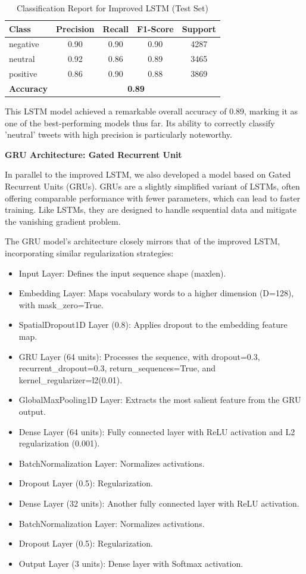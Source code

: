 \begin{table}[H]
\centering
\caption{Classification Report for Improved LSTM (Test Set)}
\begin{tabular}{|l|c|c|c|c|}
\hline
\textbf{Class} & \textbf{Precision} & \textbf{Recall} & \textbf{F1-Score} & \textbf{Support} \\
\hline
negative & 0.90 & 0.90 & 0.90 & 4287 \\
neutral  & 0.92 & 0.86 & 0.89 & 3465 \\
positive & 0.86 & 0.90 & 0.88 & 3869 \\
\hline
\textbf{Accuracy} & \multicolumn{4}{|c|}{\textbf{0.89}} \\
\hline
\end{tabular}
\label{tab:lstm2_classification_report}
\end{table}

This LSTM model achieved a remarkable overall accuracy of 0.89, marking it as one of the best-performing models thus far. Its ability to correctly classify 'neutral' tweets with high precision is particularly noteworthy.

\textbf{GRU Architecture: Gated Recurrent Unit
}

In parallel to the improved LSTM, we also developed a model based on Gated Recurrent Units (GRUs). GRUs are a slightly simplified variant of LSTMs, often offering comparable performance with fewer parameters, which can lead to faster training. Like LSTMs, they are designed to handle sequential data and mitigate the vanishing gradient problem.

The GRU model's architecture closely mirrors that of the improved LSTM, incorporating similar regularization strategies:

\begin{itemize}
    \item Input Layer: Defines the input sequence shape (maxlen).
    \item Embedding Layer: Maps vocabulary words to a higher dimension (D=128), with mask\_zero=True.
    \item SpatialDropout1D Layer (0.8): Applies dropout to the embedding feature map.
    \item GRU Layer (64 units): Processes the sequence, with dropout=0.3, recurrent\_dropout=0.3, return\_sequences=True, and kernel\_regularizer=l2(0.01).
    \item GlobalMaxPooling1D Layer: Extracts the most salient feature from the GRU output.
    \item Dense Layer (64 units): Fully connected layer with ReLU activation and L2 regularization (0.001).
    \item BatchNormalization Layer: Normalizes activations.
    \item Dropout Layer (0.5): Regularization.
    \item Dense Layer (32 units): Another fully connected layer with ReLU activation.
    \item BatchNormalization Layer: Normalizes activations.
    \item Dropout Layer (0.5): Regularization.
    \item Output Layer (3 units): Dense layer with Softmax activation.
\end{itemize}


